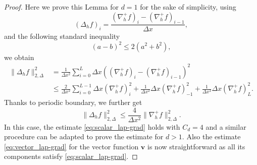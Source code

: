 \documentclass[10pt,a4paper]{amsart}
\begin{document}
\begin{proof}
Here we prove this Lemma for $d = 1$ for the sake of simplicity, using
\[
(\Delta_h f)_i=\frac{(\nabla_h^+f)_i-(\nabla_h^+f)_{i-1}}{\Delta x},
\]
and the following standard inequality
\[
(a-b)^2\le 2(a^2+b^2),
\]
we obtain
\begin{align*}
\|\Delta_h f\|_{2,\Delta}^2
&=
\frac{1}{\Delta x^2}\sum_{i=0}^L
\Delta x((\nabla_h^+f)_i-(\nabla_h^+f)_{i-1})^2\\
&\le\frac{2}{\Delta x^2}\sum_{i=0}^{L-1}
\Delta x(\nabla_h^+f)_i^2
+\frac{1}{\Delta x^2}\Delta x (\nabla_h^+f)_{-1}^2+\frac{1}{\Delta x^2}\Delta x(\nabla_h^+f)_L^2.
\end{align*}
Thanks to periodic boundary, we further get
\begin{equation}
\|\Delta_h f\|_{2,\Delta}^2\le\frac{4}{\Delta x^2}\|\nabla_h^+f\|_{2,\Delta}^2.
\end{equation}
In this case, the estimate \eqref{eq:scalar_lap-grad} holds with $C_d=4$ and a similar procedure can be adapted to prove the estimate for $d>1$. Also the estimate \eqref{eq:vector_lap-grad} for the vector function $\mathbf{v}$ is now straightforward as all its components satisfy \eqref{eq:scalar_lap-grad}.
\end{proof}
\end{document}
